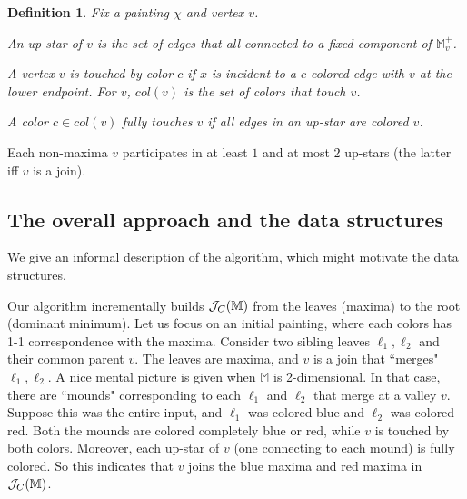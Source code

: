 \documentclass[11pt]{article}
\newcommand{\ignore}[1]{}
\newtheorem{definition}[theorem]{Definition}
\theoremstyle{definition}
\newcommand{\cJ}{{\cal J}}
\newcommand{\MM}{\mathbb{M}}
\newcommand{\eps}{\varepsilon}
\newcommand{\col}{col}
\newcommand{\fcol}{full}
\newcommand{\jc}{\cJ_C}
\begin{document}
\begin{definition} \label{def:color-set} Fix a painting $\chi$ and vertex $v$.
\begin{asparaitem}
	 \item An \emph{up-star} of $v$ is the set of edges that all connected to a fixed component of $\MM^+_v$.
	 \item A vertex $v$ is \emph{touched by color $c$} if $x$ is incident to a $c$-colored
	 edge with $v$ at the lower endpoint. For $v$, $\col(v)$ is the set of colors that touch $v$.
	 \item A color $c \in \col(v)$ \emph{fully touches} $v$ if all edges in an up-star are colored $v$.
\end{asparaitem}
\end{definition}

Each non-maxima $v$ participates in at least $1$ and at most $2$ up-stars (the latter iff
$v$ is a join).

\ignore{
Abusing notation, we say a contour $\phi$ is of color $c$ if all edges that intersect $\phi$ have color $c$.

\begin{definition} \label{def:color-full} Consider vertex $v$. An \emph{up-star} of $v$ is the set 
of edges that all connected to a fixed component of $\MM^+_v$. 
\end{definition}

Note that $\col(v)$ 
be initially determined in $O(|\MM|)$ time, by a simple linear scan.
}


\subsection{The overall approach and the data structures} \label{sec:struct}

We give an informal description of the algorithm, which might motivate the data structures.

Our algorithm incrementally builds $\jc(\MM)$ from the leaves (maxima) to the root (dominant minimum). 
Let us focus on an initial painting, where each colors has 1-1 correspondence with the maxima.
Consider two sibling leaves $\ell_1, \ell_2$ and their common parent $v$. The leaves are maxima,
and $v$ is a join that ``merges" $\ell_1, \ell_2$. A nice mental picture is given when $\MM$ is 2-dimensional.
In that case, there are ``mounds" corresponding to each $\ell_1$ and $\ell_2$ that merge
at a valley $v$. Suppose this was the entire input, and $\ell_1$ was colored blue and $\ell_2$ was colored red. 
Both the mounds are colored completely blue or red, while $v$ is touched by both colors.
Moreover, each up-star of $v$ (one connecting to each mound) is fully colored. So this
indicates that $v$ joins the blue maxima and red maxima in $\jc(\MM)$.
\end{document}
